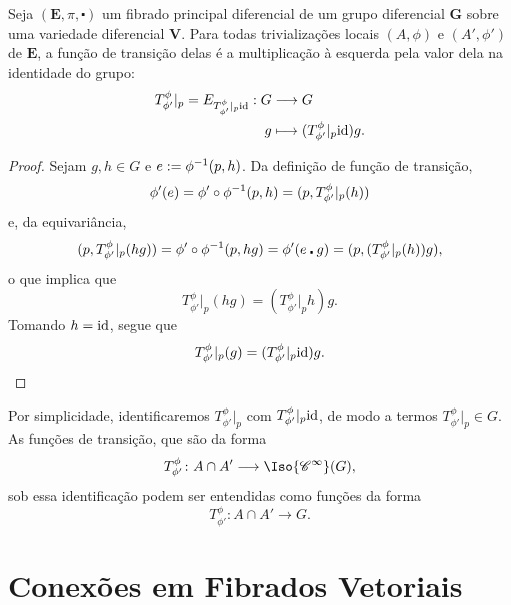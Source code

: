 \begin{prop}
Seja $(\bm E,\pi,\centerdot)$ um fibrado principal diferencial de um grupo diferencial $\bm G$ sobre uma variedade diferencial $\bm V$. Para todas trivializações locais $(A,\phi)$ e $(A',\phi')$ de $\bm E$, a função de transição delas é a multiplicação à esquerda pela valor dela na identidade do grupo:
	\begin{align*}
	{T^\phi_{\phi'}|_p = E_{T^\phi_{\phi'}|_p \mathrm{id}}}: {G} &\longrightarrow {G} \\{g} &\longmapsto {(T^\phi_{\phi'}|_p \mathrm{id}) g}.
	\end{align*}
\end{prop}
\begin{proof}
Sejam $g,h \in G$ e $e := \phi^{-1}(p,h)$. Da definição de função de transição,
	\begin{equation*}
	\phi'(e) = \phi' \circ \phi^{-1} (p,h) = (p,T^\phi_{\phi'}|_p(h))
	\end{equation*}
e, da equivariância,
	\begin{equation*}
	(p,T^\phi_{\phi'}|_p(hg)) = \phi' \circ \phi^{-1} (p,hg) = \phi'(e \centerdot g) = (p,(T^\phi_{\phi'}|_p(h))g),
	\end{equation*}
o que implica que
	\begin{equation*}
	T^\phi_{\phi'}|_p(hg) = (T^\phi_{\phi'}|_p h)g.
	\end{equation*}
Tomando $h=\mathrm{id}$, segue que
	\begin{equation*}
	T^\phi_{\phi'}|_p(g) = (T^\phi_{\phi'}|_p \mathrm{id})g.
	\end{equation*}
\end{proof}

Por simplicidade, identificaremos $T^\phi_{\phi'}|_p$ com $T^\phi_{\phi'}|_p \mathrm{id}$, de modo a termos $T^\phi_{\phi'}|_p \in G$. As funções de transição, que são da forma
	\begin{equation*}
	T^\phi_{\phi'}\colon A \cap A' \to \Iso{\cont^\infty}(G),
	\end{equation*}
sob essa identificação podem ser entendidas como funções da forma
	\begin{equation*}
	T^\phi_{\phi'}\colon A \cap A' \to G.
	\end{equation*}








\section{Conexões em Fibrados Vetoriais}

